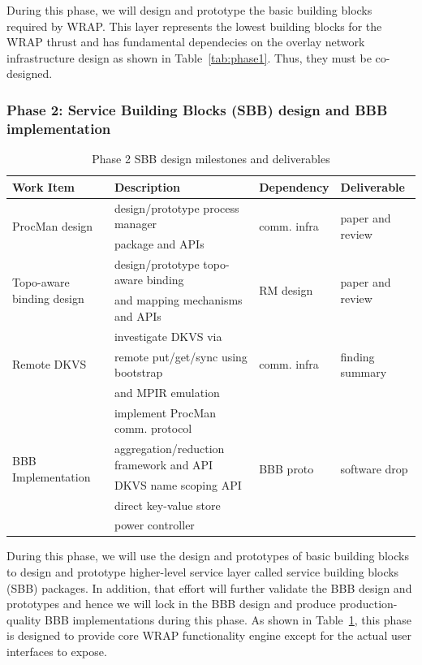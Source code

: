 During this phase, we will design and prototype the basic building blocks required
by WRAP. This layer represents the lowest building blocks for the WRAP thrust and has fundamental
dependecies on the overlay network infrastructure design as shown in Table~\ref{tab:phase1}.
Thus, they must be co-designed.

\subsubsection{Phase 2: Service Building Blocks (SBB) design and BBB implementation}
\begin{table}
\centering
\begin{tabular}{|l|l|l|l|}
\hline
Work Item & Description & Dependency & Deliverable \\
\hline
\multirow{2}{*}{ProcMan design} & design/prototype process manager & \multirow{2}{*}{comm. infra} & \multirow{2}{*}{paper and review} \\
& package and APIs & & \\ \hline
\multirow{2}{*}{Topo-aware binding design} & design/prototype topo-aware binding & \multirow{2}{*}{RM design} & \multirow{2}{*}{paper and review} \\
& and mapping mechanisms and APIs & & \\ \hline
\multirow{3}{*}{Remote DKVS} & investigate DKVS via & \multirow{3}{*}{comm. infra} & \multirow{3}{*}{finding summary} \\
& remote put/get/sync using bootstrap & & \\
& and MPIR emulation & & \\ \hline
\multirow{5}{*}{BBB Implementation} & implement ProcMan comm. protocol & \multirow{5}{*}{BBB proto} & \multirow{5}{*}{software drop} \\
& aggregation/reduction framework and API & & \\
& DKVS name scoping API & & \\
& direct key-value store & & \\
& power controller & & \\ \hline
\end{tabular}
\caption{Phase 2 SBB design milestones and deliverables}
\label{tab:phase2}
\end{table}

During this phase, we will use the design and prototypes of basic building blocks
to design and prototype higher-level service layer called service building blocks (SBB)
packages. In addition, that effort will further validate the BBB design and prototypes
and hence we will lock in the BBB design and produce production-quality BBB implementations
during this phase.
As shown in Table~\ref{tab:phase2}, this phase is designed to provide core WRAP functionality
engine except for the actual user interfaces to expose.

